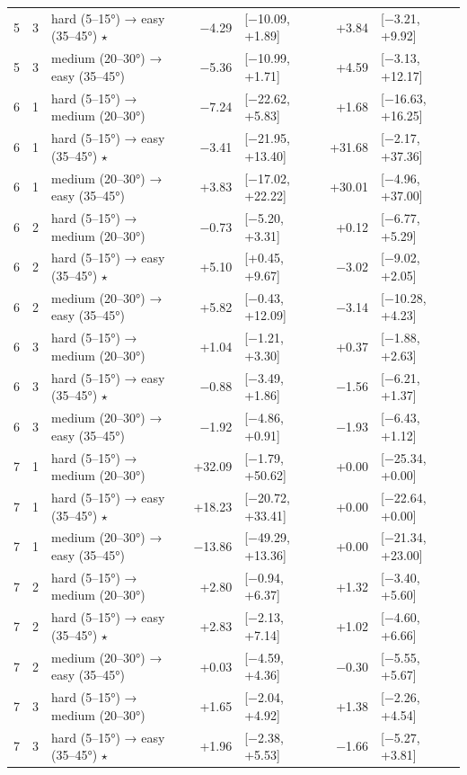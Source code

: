\begin{table}[htbp]
\begin{tabular}{rllrlrl}
    5 & 3 & hard (5–15°) → easy (35–45°) $\star$ & −4.29 & [−10.09, +1.89] & +3.84 & [−3.21, +9.92] \\
    5 & 3 & medium (20–30°) → easy (35–45°) & −5.36 & [−10.99, +1.71] & +4.59 & [−3.13, +12.17] \\
    6 & 1 & hard (5–15°) → medium (20–30°) & −7.24 & [−22.62, +5.83] & +1.68 & [−16.63, +16.25] \\
    6 & 1 & hard (5–15°) → easy (35–45°) $\star$ & −3.41 & [−21.95, +13.40] & +31.68 & [−2.17, +37.36] \\
    6 & 1 & medium (20–30°) → easy (35–45°) & +3.83 & [−17.02, +22.22] & +30.01 & [−4.96, +37.00] \\
    6 & 2 & hard (5–15°) → medium (20–30°) & −0.73 & [−5.20, +3.31] & +0.12 & [−6.77, +5.29] \\
    6 & 2 & hard (5–15°) → easy (35–45°) $\star$ & +5.10 & [+0.45, +9.67] & −3.02 & [−9.02, +2.05] \\
    6 & 2 & medium (20–30°) → easy (35–45°) & +5.82 & [−0.43, +12.09] & −3.14 & [−10.28, +4.23] \\
    6 & 3 & hard (5–15°) → medium (20–30°) & +1.04 & [−1.21, +3.30] & +0.37 & [−1.88, +2.63] \\
    6 & 3 & hard (5–15°) → easy (35–45°) $\star$ & −0.88 & [−3.49, +1.86] & −1.56 & [−6.21, +1.37] \\
    6 & 3 & medium (20–30°) → easy (35–45°) & −1.92 & [−4.86, +0.91] & −1.93 & [−6.43, +1.12] \\
    7 & 1 & hard (5–15°) → medium (20–30°) & +32.09 & [−1.79, +50.62] & +0.00 & [−25.34, +0.00] \\
    7 & 1 & hard (5–15°) → easy (35–45°) $\star$ & +18.23 & [−20.72, +33.41] & +0.00 & [−22.64, +0.00] \\
    7 & 1 & medium (20–30°) → easy (35–45°) & −13.86 & [−49.29, +13.36] & +0.00 & [−21.34, +23.00] \\
    7 & 2 & hard (5–15°) → medium (20–30°) & +2.80 & [−0.94, +6.37] & +1.32 & [−3.40, +5.60] \\
    7 & 2 & hard (5–15°) → easy (35–45°) $\star$ & +2.83 & [−2.13, +7.14] & +1.02 & [−4.60, +6.66] \\
    7 & 2 & medium (20–30°) → easy (35–45°) & +0.03 & [−4.59, +4.36] & −0.30 & [−5.55, +5.67] \\
    7 & 3 & hard (5–15°) → medium (20–30°) & +1.65 & [−2.04, +4.92] & +1.38 & [−2.26, +4.54] \\
    7 & 3 & hard (5–15°) → easy (35–45°) $\star$ & +1.96 & [−2.38, +5.53] & −1.66 & [−5.27, +3.81] \\

\end{tabular}
\end{table}
